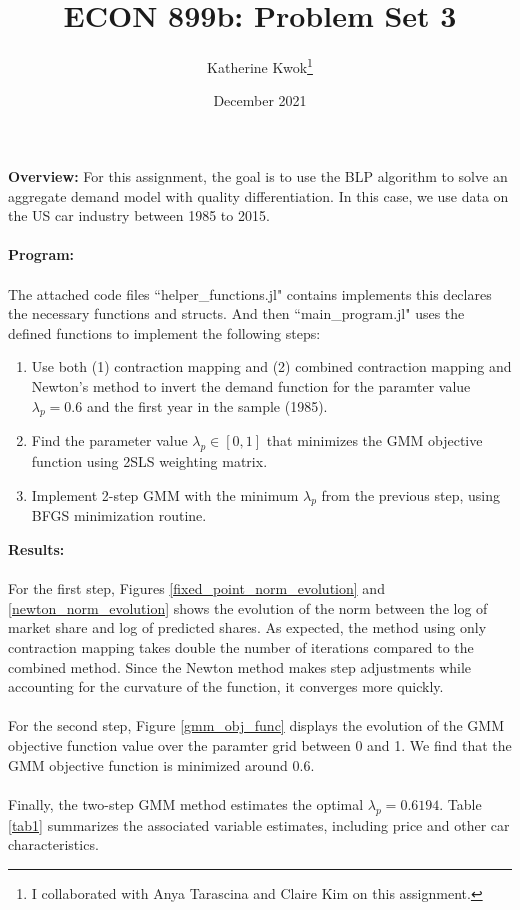 \documentclass[12pt]{article}
\title{ECON 899b: Problem Set 3}
\author{Katherine Kwok\footnote{I collaborated with Anya Tarascina and Claire Kim on this assignment.}}
\date{December 2021}
\begin{document}
\maketitle
\noindent \textbf{Overview:} For this assignment, the goal is to use the BLP algorithm to solve an aggregate demand model with quality differentiation. In this case, we use data on the US car industry between 1985 to 2015. \\\\
\noindent \textbf{Program:} \\\\
The attached code files ``helper\_functions.jl" contains implements this declares the necessary functions and structs. And then ``main\_program.jl" uses the defined functions to implement the following steps:
\begin{enumerate}
	\item Use both (1) contraction mapping and (2) combined contraction mapping and Newton's method to invert the demand function for the paramter value $\lambda_p = 0.6$ and the first year in the sample (1985).
	\item Find the parameter value $\lambda_p \in [0, 1]$ that minimizes the GMM objective function using 2SLS weighting matrix.
	\item Implement 2-step GMM with the minimum $\lambda_p$ from the previous step, using BFGS minimization routine.
\end{enumerate}
\noindent \textbf{Results:} \\\\
For the first step, Figures \ref{fixed_point_norm_evolution} and \ref{newton_norm_evolution} shows the evolution of the norm between the log of market share and log of predicted shares. As expected, the method using only contraction mapping takes double the number of iterations compared to the combined method. Since the Newton method makes step adjustments while accounting for the curvature of the function, it converges more quickly.\\\\
For the second step, Figure \ref{gmm_obj_func} displays the evolution of the GMM objective function value over the paramter grid between 0 and 1. We find that the GMM objective function is minimized around 0.6.\\\\
Finally, the two-step GMM method estimates the optimal $\lambda_p = 0.6194$. Table \ref{tab1} summarizes the associated variable estimates, including price and other car characteristics.
\end{document}
